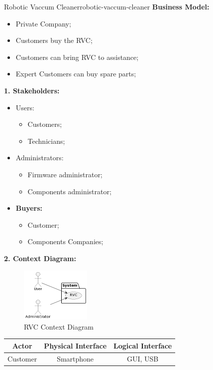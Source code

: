 \documentclass[12pt]{article}
\begin{document}
\begin{example}{Robotic Vaccum Cleaner}{robotic-vaccum-cleaner}
  \textbf{Business Model:}
  \begin{itemize}
    \item Private Company;
    \item Customers buy the RVC;
    \item Customers can bring RVC to assistance;
    \item Expert Customers can buy spare parts;
  \end{itemize}
  \textbf{1. Stakeholders:}
  \begin{itemize}
    \item Users:
      \begin{itemize}
        \item Customers;
        \item Technicians;
      \end{itemize}
    \item Administrators:
      \begin{itemize}
        \item Firmware administrator;
        \item Components administrator;
      \end{itemize}
    \item \textbf{Buyers:}
      \begin{itemize}
        \item Customer;
        \item Components Companies;
      \end{itemize}
  \end{itemize}
  \textbf{2. Context Diagram:}
  \begin{figure}[H]
    \centering
    \includegraphics[width=0.3\textwidth]{rvc-context-diagram.png}
    \caption{RVC Context Diagram}
    \label{fig:rvc-context-diagram}
  \end{figure}
  \begin{table}[H]
    \centering
    \begin{tabular}{|c|c|c|}
      \hline
      \textbf{Actor} & \textbf{Physical Interface} & \textbf{Logical Interface} \\
      \hline
      Customer & Smartphone & GUI, USB \\

\end{tabular}
\end{table}
\end{example}
\end{document}
